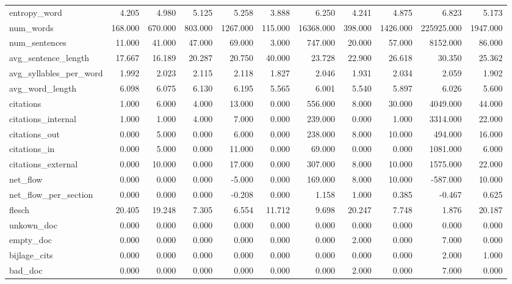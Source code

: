 \begin{tabular}{lrrrrrrrrrr}
\cline{1-11}
entropy\_word & 4.205 & 4.980 & 5.125 & 5.258 & 3.888 & 6.250 & 4.241 & 4.875 & 6.823 & 5.173 \\
\cline{1-11}
num\_words & 168.000 & 670.000 & 803.000 & 1267.000 & 115.000 & 16368.000 & 398.000 & 1426.000 & 225925.000 & 1947.000 \\
\cline{1-11}
num\_sentences & 11.000 & 41.000 & 47.000 & 69.000 & 3.000 & 747.000 & 20.000 & 57.000 & 8152.000 & 86.000 \\
\cline{1-11}
avg\_sentence\_length & 17.667 & 16.189 & 20.287 & 20.750 & 40.000 & 23.728 & 22.900 & 26.618 & 30.350 & 25.362 \\
\cline{1-11}
avg\_syllables\_per\_word & 1.992 & 2.023 & 2.115 & 2.118 & 1.827 & 2.046 & 1.931 & 2.034 & 2.059 & 1.902 \\
\cline{1-11}
avg\_word\_length & 6.098 & 6.075 & 6.130 & 6.195 & 5.565 & 6.001 & 5.540 & 5.897 & 6.026 & 5.600 \\
\cline{1-11}
citations & 1.000 & 6.000 & 4.000 & 13.000 & 0.000 & 556.000 & 8.000 & 30.000 & 4049.000 & 44.000 \\
\cline{1-11}
citations\_internal & 1.000 & 1.000 & 4.000 & 7.000 & 0.000 & 239.000 & 0.000 & 1.000 & 3314.000 & 22.000 \\
\cline{1-11}
citations\_out & 0.000 & 5.000 & 0.000 & 6.000 & 0.000 & 238.000 & 8.000 & 10.000 & 494.000 & 16.000 \\
\cline{1-11}
citations\_in & 0.000 & 5.000 & 0.000 & 11.000 & 0.000 & 69.000 & 0.000 & 0.000 & 1081.000 & 6.000 \\
\cline{1-11}
citations\_external & 0.000 & 10.000 & 0.000 & 17.000 & 0.000 & 307.000 & 8.000 & 10.000 & 1575.000 & 22.000 \\
\cline{1-11}
net\_flow & 0.000 & 0.000 & 0.000 & -5.000 & 0.000 & 169.000 & 8.000 & 10.000 & -587.000 & 10.000 \\
\cline{1-11}
net\_flow\_per\_section & 0.000 & 0.000 & 0.000 & -0.208 & 0.000 & 1.158 & 1.000 & 0.385 & -0.467 & 0.625 \\
\cline{1-11}
flesch & 20.405 & 19.248 & 7.305 & 6.554 & 11.712 & 9.698 & 20.247 & 7.748 & 1.876 & 20.187 \\
\cline{1-11}
unkown\_doc & 0.000 & 0.000 & 0.000 & 0.000 & 0.000 & 0.000 & 0.000 & 0.000 & 0.000 & 0.000 \\
\cline{1-11}
empty\_doc & 0.000 & 0.000 & 0.000 & 0.000 & 0.000 & 0.000 & 2.000 & 0.000 & 7.000 & 0.000 \\
\cline{1-11}
bijlage\_cits & 0.000 & 0.000 & 0.000 & 0.000 & 0.000 & 0.000 & 0.000 & 0.000 & 2.000 & 1.000 \\
\cline{1-11}
bad\_doc & 0.000 & 0.000 & 0.000 & 0.000 & 0.000 & 0.000 & 2.000 & 0.000 & 7.000 & 0.000 \\
\cline{1-11}
\bottomrule
\end{tabular}
